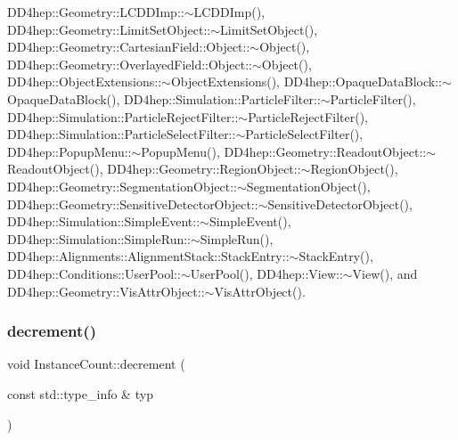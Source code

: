D\+D4hep\+::\+Geometry\+::\+L\+C\+D\+D\+Imp\+::$\sim$\+L\+C\+D\+D\+Imp(), D\+D4hep\+::\+Geometry\+::\+Limit\+Set\+Object\+::$\sim$\+Limit\+Set\+Object(), D\+D4hep\+::\+Geometry\+::\+Cartesian\+Field\+::\+Object\+::$\sim$\+Object(), D\+D4hep\+::\+Geometry\+::\+Overlayed\+Field\+::\+Object\+::$\sim$\+Object(), D\+D4hep\+::\+Object\+Extensions\+::$\sim$\+Object\+Extensions(), D\+D4hep\+::\+Opaque\+Data\+Block\+::$\sim$\+Opaque\+Data\+Block(), D\+D4hep\+::\+Simulation\+::\+Particle\+Filter\+::$\sim$\+Particle\+Filter(), D\+D4hep\+::\+Simulation\+::\+Particle\+Reject\+Filter\+::$\sim$\+Particle\+Reject\+Filter(), D\+D4hep\+::\+Simulation\+::\+Particle\+Select\+Filter\+::$\sim$\+Particle\+Select\+Filter(), D\+D4hep\+::\+Popup\+Menu\+::$\sim$\+Popup\+Menu(), D\+D4hep\+::\+Geometry\+::\+Readout\+Object\+::$\sim$\+Readout\+Object(), D\+D4hep\+::\+Geometry\+::\+Region\+Object\+::$\sim$\+Region\+Object(), D\+D4hep\+::\+Geometry\+::\+Segmentation\+Object\+::$\sim$\+Segmentation\+Object(), D\+D4hep\+::\+Geometry\+::\+Sensitive\+Detector\+Object\+::$\sim$\+Sensitive\+Detector\+Object(), D\+D4hep\+::\+Simulation\+::\+Simple\+Event\+::$\sim$\+Simple\+Event(), D\+D4hep\+::\+Simulation\+::\+Simple\+Run\+::$\sim$\+Simple\+Run(), D\+D4hep\+::\+Alignments\+::\+Alignment\+Stack\+::\+Stack\+Entry\+::$\sim$\+Stack\+Entry(), D\+D4hep\+::\+Conditions\+::\+User\+Pool\+::$\sim$\+User\+Pool(), D\+D4hep\+::\+View\+::$\sim$\+View(), and D\+D4hep\+::\+Geometry\+::\+Vis\+Attr\+Object\+::$\sim$\+Vis\+Attr\+Object().

\hypertarget{struct_d_d4hep_1_1_instance_count_a99ffc259c76fc693c83e8cc493ace1f6}{}\label{struct_d_d4hep_1_1_instance_count_a99ffc259c76fc693c83e8cc493ace1f6} 
\subsubsection{\texorpdfstring{decrement()}{decrement()}\hspace{0.1cm}{\footnotesize\ttfamily [2/3]}}
{\footnotesize\ttfamily void Instance\+Count\+::decrement (\begin{DoxyParamCaption}\item[{const std\+::type\+\_\+info \&}]{typ }\end{DoxyParamCaption})\hspace{0.3cm}{\ttfamily [static]}}



